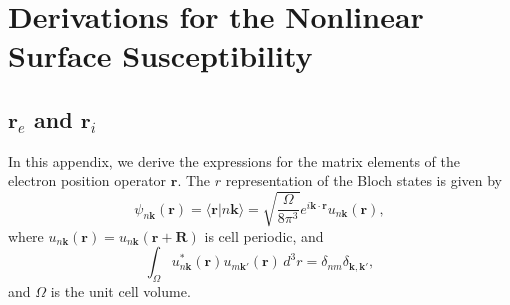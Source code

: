 \chapter{Derivations for the Nonlinear Surface Susceptibility}
\label{app:chi2deriv}
\partialtoc



\section{\texorpdfstring{$\mathbf{r}_{e}$ and $\mathbf{r}_{i}$}{re and ri}}
\label{app:re_ri}

In this appendix, we derive the expressions for the matrix elements of the
electron position operator $\mathbf{r}$. The $r$ representation of the Bloch
states is given by
\begin{equation}\label{bloch}
\psi_{n\mathbf{k}}(\mathbf{r})=\langle\mathbf{r}\vert n\mathbf{k}\rangle =
\sqrt{\frac{\Omega}{8\pi^{3}}}
e^{i\mathbf{k} \cdot \mathbf{r}}u_{n\mathbf{k}}(\mathbf{r}),
\end{equation}
where $u_{n\mathbf{k}}(\mathbf{r}) = u_{n\mathbf{k}}(\mathbf{r} + \mathbf{R})$
is cell periodic, and
\begin{equation}\label{normal}
\int_{\Omega}
u_{n\mathbf{k}}^{*}(\mathbf{r})u_{m\mathbf{k}'}(\mathbf{r})\,d^{3}r
= \delta_{nm}\delta_{\mathbf{\mathbf{k},\mathbf{k}'}},
\end{equation}
and $\Omega$ is the unit cell volume.

